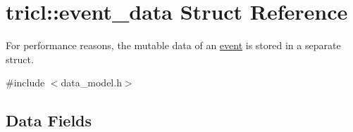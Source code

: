 \hypertarget{structtricl_1_1event__data}{}\section{tricl\+:\+:event\+\_\+data Struct Reference}
\label{structtricl_1_1event__data}


For performance reasons, the mutable data of an \hyperlink{structtricl_1_1event}{event} is stored in a separate struct.  




{\ttfamily \#include $<$data\+\_\+model.\+h$>$}

\subsection*{Data Fields}
